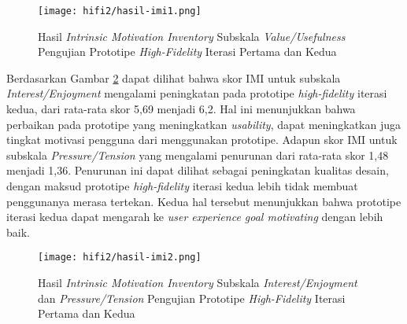 \begin{enumerate}
  \begin{figure}[h]
    \centering
    \texttt{[image: hifi2/hasil-imi1.png]}
    \caption{Hasil \textit{Intrinsic Motivation Inventory} Subskala \textit{Value/Usefulness} Pengujian Prototipe \textit{High-Fidelity} Iterasi Pertama dan Kedua}
    \label{img:imi1_2}
  \end{figure}
  \FloatBarrier
  
  \subitem  Berdasarkan Gambar \ref{img:imi2_2} dapat dilihat bahwa skor IMI untuk subskala \textit{Interest/Enjoyment} mengalami peningkatan pada prototipe \textit{high-fidelity} iterasi kedua, dari rata-rata skor 5,69 menjadi 6,2. Hal ini menunjukkan bahwa perbaikan pada prototipe yang meningkatkan \textit{usability}, dapat meningkatkan juga tingkat motivasi pengguna dari menggunakan prototipe. Adapun skor IMI untuk subskala \textit{Pressure/Tension} yang mengalami penurunan dari rata-rata skor 1,48 menjadi 1,36. Penurunan ini dapat dilihat sebagai peningkatan kualitas desain, dengan maksud prototipe \textit{high-fidelity} iterasi kedua lebih tidak membuat penggunanya merasa tertekan. Kedua hal tersebut menunjukkan bahwa prototipe iterasi kedua dapat mengarah ke \textit{user experience goal motivating} dengan lebih baik.

  \begin{figure}[h]
    \centering
    \texttt{[image: hifi2/hasil-imi2.png]}
    \caption{Hasil \textit{Intrinsic Motivation Inventory} Subskala \textit{Interest/Enjoyment} dan \textit{Pressure/Tension} Pengujian Prototipe \textit{High-Fidelity} Iterasi Pertama dan Kedua}
    \label{img:imi2_2}
  \end{figure}
  \FloatBarrier

\end{enumerate}
